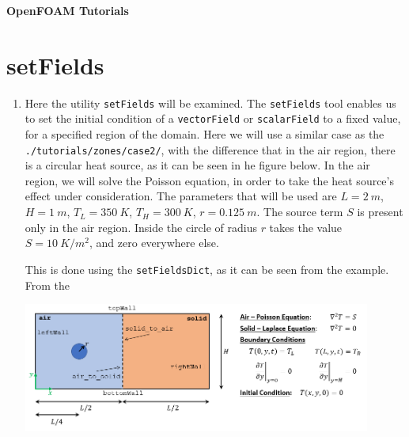 \documentclass{article}
\begin{document}
\noindent
\begin{huge}
\hspace{-3.0mm}\textbf{OpenFOAM Tutorials}
\end{huge}

\setcounter{section}{3}
\section{setFields}
	
\begin{enumerate}[4.1]
	\item Here the utility {\tt setFields} will be examined. The {\tt setFields} tool enables us to set the initial condition of a {\tt vectorField} or {\tt scalarField} to a fixed value, for a specified region of the domain. Here we will use a similar case as the {\tt ./tutorials/zones/case2/}, with the difference that in the air region, there is a circular heat source, as it can be seen in he figure below. In the air region, we will solve the Poisson equation, in order to take the heat source's effect under consideration. The parameters that will be used are $L=2~m$, $H=1~m$, $T_L=350~K$, $T_H=300~K$, $r=0.125~m$. The source term $S$ is present only in the air region. Inside the circle of radius $r$ takes the value $S=10~K/m^2$, and zero everywhere else. 
	
	This is done using the {\tt setFieldsDict}, as it can be seen from the example. From the 
	
	
	\begin{center}
		\includegraphics[width=0.9\textwidth]{source.png}
	\end{center}

	
\end{enumerate}
\end{document}
